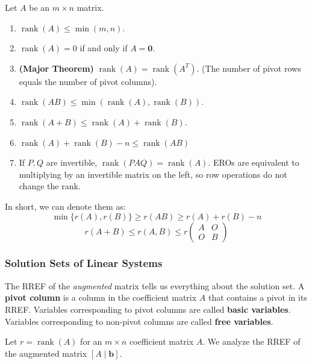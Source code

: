 \begin{property}
Let $A$ be an $m \times n$ matrix.
\begin{enumerate}
    \item $\operatorname{rank}(A) \le \min(m, n)$.
    \item $\operatorname{rank}(A) = 0$ if and only if $A = \mathbf{0}$.
    \item \textbf{(Major Theorem)} $\operatorname{rank}(A) = \operatorname{rank}(A^T)$. (The number of pivot rows equals the number of pivot columns).
    \item $\operatorname{rank}(AB) \le \min(\operatorname{rank}(A), \operatorname{rank}(B))$.
    \item $\operatorname{rank}(A+B) \le \operatorname{rank}(A) + \operatorname{rank}(B)$.
    \item $\operatorname{rank}(A)+\operatorname{rank}(B)-n \le \operatorname{rank}(AB)$
    \item If $P, Q$ are invertible, $\operatorname{rank}(PAQ) = \operatorname{rank}(A)$. EROs are equivalent to multiplying by an invertible matrix on the left, so row operations do not change the rank.
\end{enumerate}
In short, we can denote them as:
\[
\min \{r(A),r(B)\} \geq r(AB) \geq r(A) + r(B) - n
\]
\[
r(A+B) \leq r(A,B) \leq r \begin{pmatrix}
    A & O \\
    O & B
\end{pmatrix}
\]
\end{property}

\subsubsection{Solution Sets of Linear Systems}

The RREF of the \emph{augmented} matrix tells us everything about the solution set.
A \textbf{pivot column} is a column in the coefficient matrix $A$ that contains a pivot in its RREF.
Variables corresponding to pivot columns are called \textbf{basic variables}.
Variables corresponding to non-pivot columns are called \textbf{free variables}.

Let $r = \operatorname{rank}(A)$ for an $m \times n$ coefficient matrix $A$.
We analyze the RREF of the augmented matrix $[A \mid \mathbf{b}]$.

